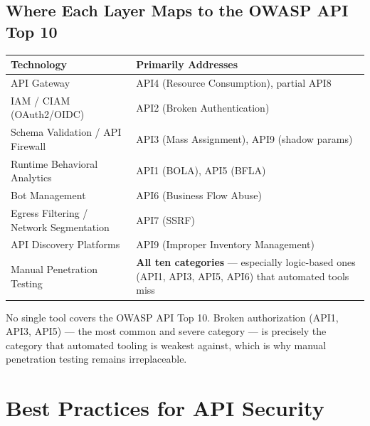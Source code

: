 \documentclass[11pt]{article}
\begin{document}
\subsection{Where Each Layer Maps to the OWASP API Top 10}
\begin{center}
\begin{tabular}{|p{4.6cm}|p{9.5cm}|}
\hline
\rowcolor{bgblack}
\textcolor{acid}{\textbf{Technology}} & \textcolor{acid}{\textbf{Primarily Addresses}} \\
\hline
API Gateway & API4 (Resource Consumption), partial API8 \\
\hline
IAM / CIAM (OAuth2/OIDC) & API2 (Broken Authentication) \\
\hline
Schema Validation / API Firewall & API3 (Mass Assignment), API9 (shadow params) \\
\hline
Runtime Behavioral Analytics & API1 (BOLA), API5 (BFLA) \\
\hline
Bot Management & API6 (Business Flow Abuse) \\
\hline
Egress Filtering / Network Segmentation & API7 (SSRF) \\
\hline
API Discovery Platforms & API9 (Improper Inventory Management) \\
\hline
Manual Penetration Testing & \textbf{All ten categories} --- especially logic-based ones (API1, API3, API5, API6) that automated tools miss \\
\hline
\end{tabular}
\end{center}

\begin{notebox}
No single tool covers the OWASP API Top 10. Broken authorization (API1, API3, API5) --- the most common and severe category --- is precisely the category that automated tooling is weakest against, which is why manual penetration testing remains irreplaceable.
\end{notebox}

\newpage
\section{Best Practices for API Security}
\end{document}
